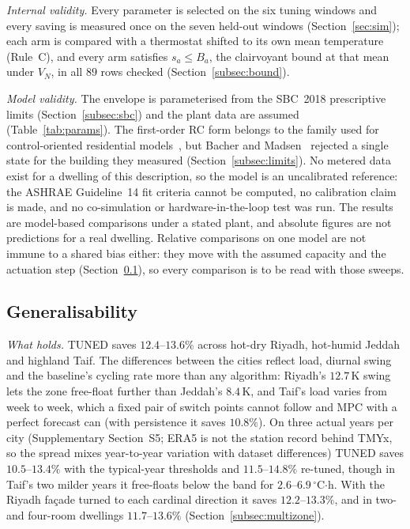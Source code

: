 \documentclass[3p,twocolumn,number]{elsarticle}
\begin{document}
\emph{Internal validity.} Every parameter is selected on the six tuning windows and every saving is measured once on the seven held-out windows (Section~\ref{sec:sim}); each arm is compared with a thermostat shifted to its own mean temperature (Rule~C), and every arm satisfies $s_a\le B_a$, the clairvoyant bound at that mean under $V_N$, in all $89$ rows checked (Section~\ref{subsec:bound}).

\emph{Model validity.} The envelope is parameterised from the SBC~2018 prescriptive limits (Section~\ref{subsec:sbc}) and the plant data are assumed (Table~\ref{tab:params}). The first-order RC form belongs to the family used for control-oriented residential models~\cite{Wang2021RC,Shi2022}, but Bacher and Madsen~\cite{Bacher2011} rejected a single state for the building they measured (Section~\ref{subsec:limits}). No metered data exist for a dwelling of this description, so the model is an uncalibrated reference: the ASHRAE Guideline~14 fit criteria cannot be computed, no calibration claim is made, and no co-simulation or hardware-in-the-loop test was run. The results are model-based comparisons under a stated plant, and absolute figures are not predictions for a real dwelling. Relative comparisons on one model are not immune to a shared bias either: they move with the assumed capacity and the actuation step (Section~\ref{subsec:generalisability}), so every comparison is to be read with those sweeps.

\subsection{Generalisability}
\label{subsec:generalisability}

\emph{What holds.} TUNED saves $12.4$--$13.6\%$ across hot-dry Riyadh, hot-humid Jeddah and highland Taif. The differences between the cities reflect load, diurnal swing and the baseline's cycling rate more than any algorithm: Riyadh's $12.7\,$K swing lets the zone free-float further than Jeddah's $8.4\,$K, and Taif's load varies from week to week, which a fixed pair of switch points cannot follow and MPC with a perfect forecast can (with persistence it saves $10.8\%$). On three actual years per city (Supplementary Section~S5; ERA5 is not the station record behind TMYx, so the spread mixes year-to-year variation with dataset differences) TUNED saves $10.5$--$13.4\%$ with the typical-year thresholds and $11.5$--$14.8\%$ re-tuned, though in Taif's two milder years it free-floats below the band for $2.6$--$6.9\,^\circ$C$\cdot$h. With the Riyadh façade turned to each cardinal direction it saves $12.2$--$13.3\%$, and in two- and four-room dwellings $11.7$--$13.6\%$ (Section~\ref{subsec:multizone}).
\end{document}
